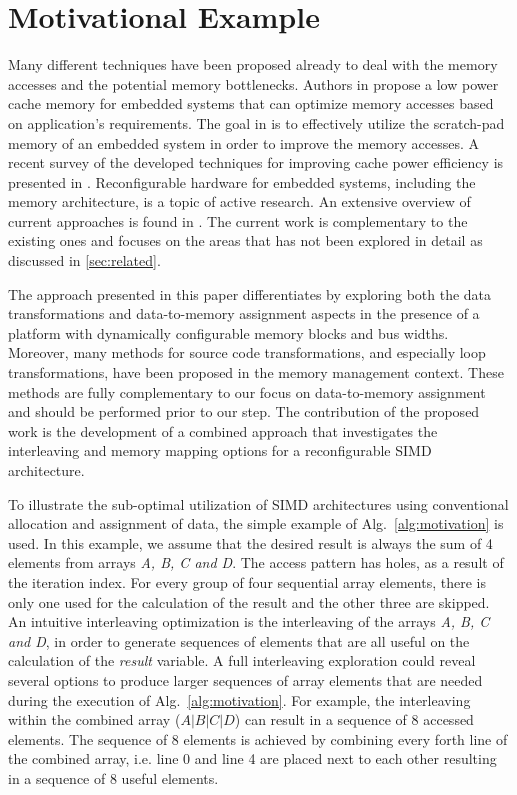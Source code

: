 \documentclass[prodmode,acmtecs]{acmsmall}
\begin{document}
\section{Motivational Example}
\label{sec:motivational}
%
Many different techniques have been proposed already to deal with the memory accesses and the potential memory bottlenecks. 
Authors in \cite{malik2000low} propose a low power cache memory for embedded systems that can optimize memory accesses based on application's requirements.
The goal in \cite{guo2013data} is to effectively utilize the scratch-pad memory of an embedded system in order to improve the memory accesses.
A recent survey of the developed techniques for improving cache power efficiency is presented in \cite{mittal2014survey}.
Reconfigurable hardware for embedded systems, including the memory architecture, is a topic of active research. 
An extensive overview of current approaches is found in \cite{Garcia}. 
The current work is complementary to the existing ones and focuses on the areas that has not been explored in detail as discussed in \ref{sec:related}.

The approach presented in this paper differentiates by exploring both the data transformations and data-to-memory assignment aspects in the presence of a platform with dynamically configurable memory blocks and bus widths. 
Moreover, many methods for source code transformations, and especially loop transformations, have been proposed in the memory management context. 
These methods are fully complementary to our focus on data-to-memory assignment and should be performed prior to our step.
The contribution of the proposed work is the development of a combined approach that investigates the interleaving and memory mapping options for a reconfigurable SIMD architecture.  

To illustrate the sub-optimal utilization of SIMD architectures using conventional allocation and assignment of data, the simple example of Alg.~\ref{alg:motivation} is used.
In this example, we assume that the desired result is always the sum of 4 elements from arrays \textit{A, B, C and D}. 
The access pattern has holes, as a result of the iteration index.
For every group of four sequential array elements, there is only one used for the calculation of the result and the other three are skipped.
An intuitive interleaving optimization is the interleaving of the arrays \textit{A, B, C and D}, in order to generate sequences of elements that are all useful on the calculation of the \textit{result} variable. 
A full interleaving exploration could reveal several options to produce larger sequences of array elements that are needed during the execution of Alg.~\ref{alg:motivation}.
For example, the interleaving within the combined array ($A\vert B\vert C\vert D$) can result in a sequence of 8 accessed elements.
The sequence of 8 elements is achieved by combining every forth line of the combined array, i.e. line 0 and line 4 are placed next to each other resulting in a sequence of 8 useful elements.
\end{document}
